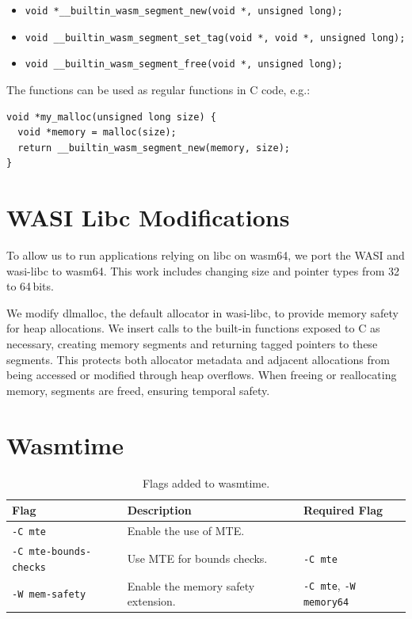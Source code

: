 \begin{itemize}
  \item \lstinline[style=customc]{void *__builtin_wasm_segment_new(void *, unsigned long);}
  \item \lstinline[style=customc]{void __builtin_wasm_segment_set_tag(void *, void *, unsigned long);}
  \item \lstinline[style=customc]{void __builtin_wasm_segment_free(void *, unsigned long);}
\end{itemize}

The functions can be used as regular functions in C code, e.g.:

\begin{lstlisting}[frame=h,style=customc,
  label={lst:builtin-functions}]
void *my_malloc(unsigned long size) {
  void *memory = malloc(size);
  return __builtin_wasm_segment_new(memory, size);
}
\end{lstlisting}

\section{WASI Libc Modifications}
\label{sec:wasi-libc}

To allow us to run applications relying on libc on wasm64, we port the \acf{WASI} and wasi-libc to wasm64.
This work includes changing size and pointer types from 32 to 64\,bits.

We modify dlmalloc, the default allocator in wasi-libc, to provide memory safety for heap allocations.
We insert calls to the built-in functions exposed to C as necessary, creating memory segments and returning tagged pointers to these segments.
This protects both allocator metadata and adjacent allocations from being accessed or modified through heap overflows.
When freeing or reallocating memory, segments are freed, ensuring temporal safety.

\section{Wasmtime}
\label{sec:wasm-runtime}

\begin{table}[t]
  \centering
  \begin{tabular}{l | l | l}
    \textbf{Flag} & \textbf{Description} & \textbf{Required Flag} \\
    \hline
    \texttt{-C mte}               & Enable the use of \ac{MTE}. & \\
    \texttt{-C mte-bounds-checks} & Use \ac{MTE} for bounds checks. & \texttt{-C mte} \\
    \texttt{-W mem-safety}        & Enable the memory safety extension. & \texttt{-C mte}, \texttt{-W memory64} \\
  \end{tabular}
  \caption{Flags added to wasmtime.}
  \label{tab:wasmtime-flags}
\end{table}

